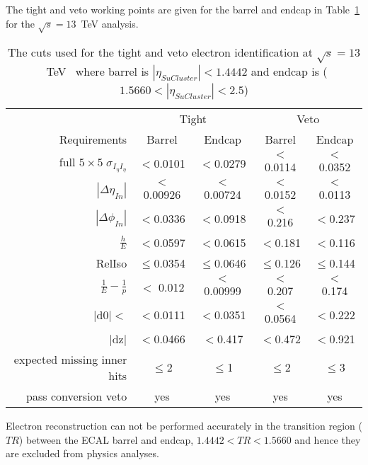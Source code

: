 The tight and veto working points are given for the barrel and endcap in Table~\ref{tab:electron_tight_cuts13} for the $\sqrt{s}=13$~TeV analysis. 

\begin{table}[htpb!]
\footnotesize
\begin{center}
\begin{tabular}{|r|c|c|c|c|}
\hline
& \multicolumn{2}{c|}{Tight} & \multicolumn{2}{c|}{Veto} \\
\cline{2-5}
Requirements &  Barrel        &   Endcap  &  Barrel        &   Endcap  \\
\hline
full $5\times5 \; \sigma_{I_{\eta}I_{\eta}} $ & $ <$0.0101 & $ <$0.0279 & $ <$0.0114 & $ <$0.0352\\
$|\Delta \eta_{In}| $  & $ <$0.00926 &$ <$ 0.00724  & $ <$0.0152 & $ <$0.0113  \\
$|\Delta \phi_{In}|  $  &  $<$0.0336 & $<$0.0918 & $<$ 0.216 & $<$0.237  \\
$\frac{h}{E} $ &$<$0.0597 & $<$0.0615  &$<$0.181 & $<$0.116  \\
RelIso & $\leq$0.0354 & $\leq$0.0646& $\leq$0.126 & $\leq$0.144\\
$\frac{1}{E} - \frac{1}{p}  $ & $<$ 0.012 & $<$ 0.00999  & $<$ 0.207 & $<$ 0.174 \\
$|$d$0| < $  & $<$0.0111 & $<$0.0351  & $<$0.0564 & $<$0.222\\
$|$dz$| $  & $<$0.0466 & $<$0.417 & $<$0.472 & $<$0.921\\
expected missing inner hits  & $\leq$2 & $\leq$1 & $\leq$2 & $\leq$3  \\
pass conversion veto & yes & yes& yes & yes  \\
\hline
\end{tabular}
\caption{The cuts used for the tight and veto electron identification at $\sqrt{s}=13$~TeV~\cite{electronID} where barrel is $|\eta_{SuCluster}|< 1.4442$ and endcap is  ($1.5660<|\eta_{SuCluster}|<2.5$)}
\label{tab:electron_tight_cuts13}
\end{center}
\end{table}

Electron reconstruction can not be performed accurately in the transition region ($TR$) between the ECAL barrel and endcap, $1.4442<TR<1.5660$ and hence they are excluded from physics analyses.

